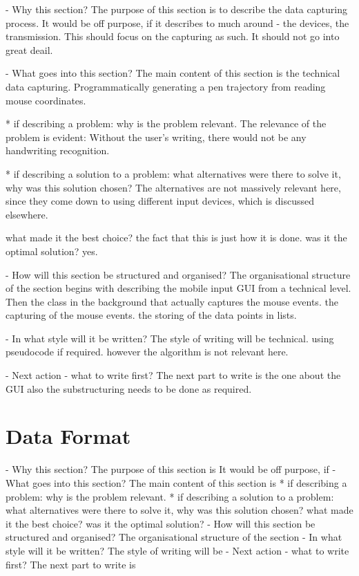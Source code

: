 - Why this section? 
  The purpose of this section is to describe the data capturing process.
  It would be off purpose, if it describes to much around - the devices, the
  transmission. This should focus on the capturing as such.
  It should not go into great deail.
  
- What goes into this section?
  The main content of this section is the technical data capturing.
  Programmatically generating a pen trajectory from reading mouse coordinates.
  
  
  * if describing a problem: why is the problem relevant.
    The relevance of the problem is evident: Without the user's writing,
    there would not be any handwriting recognition.

  * if describing a solution to a problem: what alternatives were
    there to solve it, why was this solution chosen? 
    The alternatives are not massively relevant here, since they come down
    to using different input devices, which is discussed elsewhere.

    what made it the best choice? 
    the fact that this is just how it is done.
    was it the optimal solution?
    yes.

- How will this section be structured and organised?
  The organisational structure of the section begins with describing the mobile 
  input GUI from a technical level.
  Then the class in the background that actually captures the mouse events.
  the capturing of the mouse events.
  the storing of the data points in lists.
 
- In what style will it be written?
  The style of writing will be technical. using pseudocode if required.
  however the algorithm is not relevant here.

- Next action - what to write first?
  The next part to write is the one about the GUI
  also the substructuring needs to be done as required.



\section{Data Format}
\label{sec:hwre:dataformat}

- Why this section? 
  The purpose of this section is 
  It would be off purpose, if 
- What goes into this section?
  The main content of this section is 
  * if describing a problem: why is the problem relevant.
  * if describing a solution to a problem: what alternatives were
    there to solve it, why was this solution chosen? 
    what made it the best choice? was it the optimal solution?
- How will this section be structured and organised?
  The organisational structure of the section 
- In what style will it be written?
  The style of writing will be 
- Next action - what to write first?
  The next part to write is

